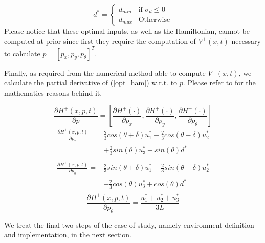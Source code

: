 \begin{equation}
  d^* = 
	\begin{cases} 
		d_{min} &\text{if } \sigma_{d} \leq 0\\
		d_{max} &\text{Otherwise} 
	\end{cases}
  \label{opt_d}
\end{equation}
Please notice that these optimal inputs, as well as the Hamiltonian, cannot be computed at prior since first they require the computation of $V^+(x,t)$ necessary to calculate $p = [p_x, p_y, p_{\theta}]^T$.

Finally, as required from the numerical method able to compute $V^+(x,t)$, we calculate the partial derivative of (\ref{opt_ham}) w.r.t. to $p$. Please refer to \cite{new_paper} \cite{mitch_phd} for the mathematics reasons behind it.

\begin{equation}
  \frac{\partial H^+(x,p,t)}{\partial p} = 
    \left[
      \frac{\partial H^+(\cdot)}{\partial p_x},
      \frac{\partial H^+(\cdot)}{\partial p_y},
      \frac{\partial H^+(\cdot)}{\partial p_{\theta}}    
    \right]
\end{equation}
\begin{equation*}
  \begin{split}
    \frac{\partial H^+(x,p,t)}{\partial p_x} =
    &
    \frac{2}{3}cos(\theta+\delta)u_1^* - \frac{2}{3}cos(\theta-\delta)u_2^* \\
    &
    + \frac{2}{3}sin(\theta)u_3^* - sin(\theta)d^* \\
  \end{split}
\end{equation*}
\begin{equation*}
  \begin{split}
    \frac{\partial H^+(x,p,t)}{\partial p_y} =
    &
    \frac{2}{3}sin(\theta+\delta)u_1^* - \frac{2}{3}sin(\theta-\delta)u_2^* \\
    &
    - \frac{2}{3}cos(\theta)u_3^* + cos(\theta)d^* \\
  \end{split}
\end{equation*}
\begin{equation*}
    \frac{\partial H^+(x,p,t)}{\partial p_{\theta}} = \frac{u_1^* + u_2^* + u_3^*}{3L} 
\end{equation*}

We treat the final two steps of the case of study, namely environment definition and implementation, in the next section.



